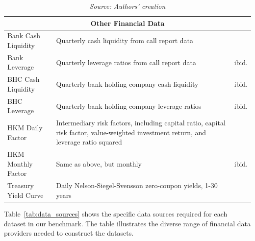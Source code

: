\documentclass{article}
\begin{document}
\begin{table}[htbp]
\begin{tabular}{p{3cm}p{6cm}p{3.5cm}}
\midrule
\multicolumn{3}{c}{\textbf{Other Financial Data}} \\
\midrule
Bank Cash Liquidity & Quarterly cash liquidity from call report data & \cite{Drechsler2017} \\
Bank Leverage & Quarterly leverage ratios from call report data & ibid. \\
BHC Cash Liquidity & Quarterly bank holding company cash liquidity & ibid. \\
BHC Leverage & Quarterly bank holding company leverage ratios & ibid. \\
HKM Daily Factor & Intermediary risk factors, including capital ratio, capital risk factor, value-weighted investment return, and leverage ratio squared & \cite{He2017} \\
HKM Monthly Factor & Same as above, but monthly & ibid. \\
Treasury Yield Curve & Daily Nelson-Siegel-Svensson zero-coupon yields, 1-30 years & \cite{Gurkaynak2007} \\
\bottomrule
\end{tabular}
\caption*{\emph{Source: Authors' creation}}
\end{table}

Table~\ref{tab:data_sources} shows the specific data sources required for each dataset in our benchmark. The table illustrates the diverse range of financial data providers needed to construct the datasets.
\end{document}

